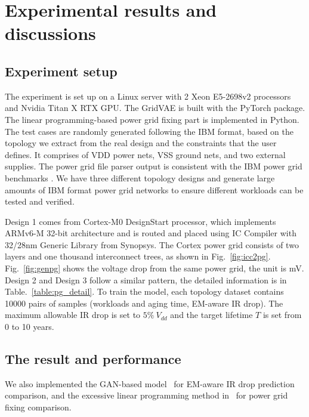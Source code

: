 \section{Experimental results and discussions}
\label{sec:results}
\subsection{Experiment setup}
The experiment is set up on a Linux server with 2 Xeon E5-2698v2 processors and Nvidia Titan X RTX GPU. 
The GridVAE is built with the PyTorch package. 
The linear programming-based power grid fixing part is implemented in Python.
The test cases are randomly generated following the IBM format, based on the topology we extract from the real design and the constraints that the user defines.
It comprises of VDD power nets, VSS ground nets, and two external supplies.
The power grid file parser output is consistent with the IBM power grid benchmarks \cite{Nassif:ASPDAC'08}.
We have three different topology designs and generate large amounts of IBM format power grid networks to ensure different workloads can be tested and verified. 

Design 1 comes from Cortex-M0 DesignStart processor, which implements ARMv6-M 32-bit architecture and is routed and placed using IC Compiler with 32/28nm Generic Library from Synopsys. 
The Cortex power grid consists of two layers and one thousand interconnect trees, as shown in Fig.~\ref{fig:icc2pg}. Fig.~\ref{fig:genpg} shows the voltage drop from the same power grid, the unit is mV.
Design 2 and Design 3 follow a similar pattern, the detailed information is in Table.~\ref{table:pg_detail}.
To train the model, each topology dataset contains 10000 pairs of samples  (workloads and aging time, EM-aware IR drop). The maximum allowable IR drop is set to $5\% \ V_{dd}$ and the target lifetime $\textit{T}$ is set from 0 to 10 years. 




\subsection{The result and performance}
We also implemented the GAN-based model~\cite{ZhouJin:ICCAD'20} for EM-aware IR drop prediction comparison, and the excessive linear programming method in~\cite{Sukharev:2019pg} for power grid fixing comparison. 

